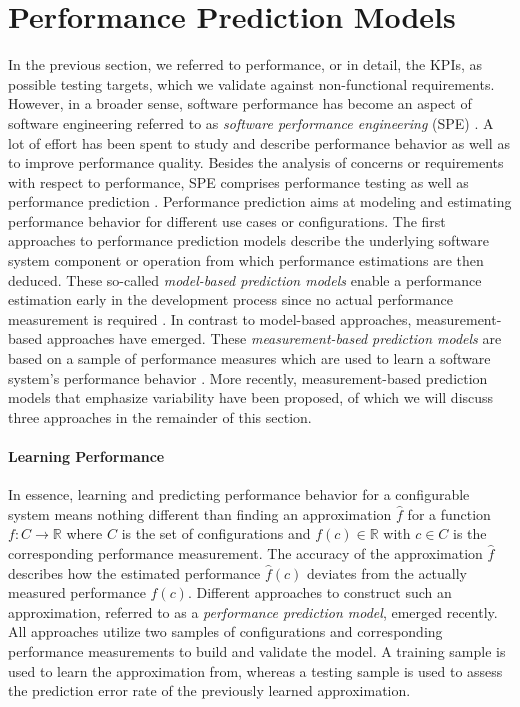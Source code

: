 \section{Performance Prediction Models}\label{sec:performance_prediction_models} 
In the previous section, we referred to performance, or in detail, the KPIs, as
possible testing targets, which we validate against non-functional requirements.
However, in a broader sense, software performance has become an aspect of
software engineering referred to as \emph{software performance engineering}
(SPE) \citep{woodside_future_2007}.
A lot of effort has been spent to study and describe performance behavior as well
as to improve performance quality. Besides the analysis of concerns or
requirements with respect to performance, SPE comprises performance testing as
well as performance prediction \citep{woodside_future_2007}. Performance
prediction aims at modeling and estimating performance behavior for different
use cases or configurations. The first approaches to performance prediction
models describe the underlying software system component or operation from which
performance estimations are then deduced. These so-called \emph{model-based prediction models} enable a performance estimation early in the development process since no actual
performance measurement is required \citep{woodside_future_2007}. In contrast
to model-based approaches, measurement-based approaches have emerged. These \emph{measurement-based prediction models} are based on a sample of performance
measures which are used to learn a software system's performance behavior
\citep{woodside_future_2007}. More recently, measurement-based prediction models that emphasize variability have been
proposed, of which we will discuss three approaches in the remainder of
this section.

\paragraph{Learning Performance} In essence, learning and predicting
performance behavior for a configurable system means nothing different than finding an
approximation $\hat{f}$ for a function $f: C \rightarrow \mathbb{R}$ where $C$
is the set of configurations and $f(c) \in \mathbb{R}$ with $c \in C$ is the corresponding performance measurement. The
accuracy of the approximation $\hat{f}$ describes how the estimated performance
$\hat{f}(c)$ deviates from the actually measured performance $f(c)$. 
Different approaches to construct such an approximation, referred to as a
\emph{performance prediction model}, emerged recently. All approaches utilize
two samples of configurations and corresponding performance
measurements to build and validate the model. A training sample is used to
learn the approximation from, whereas a testing sample is used to assess the
prediction error rate of the previously learned approximation. 

